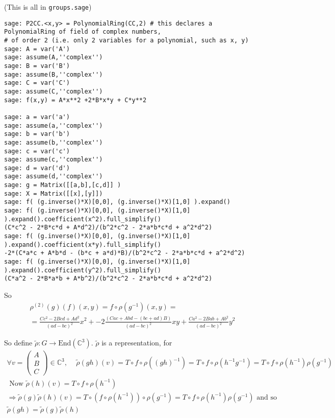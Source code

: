 \documentclass[10pt]{amsart}
\begin{document}
\begin{multicols*}{2}
\begin{enumerate}
(This is all in \verb|groups.sage|)
\begin{lstlisting}
sage: P2CC.<x,y> = PolynomialRing(CC,2) # this declares a PolynomialRing of field of complex numbers, 
# of order 2 (i.e. only 2 variables for a polynomial, such as x, y)
sage: A = var('A')
sage: assume(A,''complex'')
sage: B = var('B')
sage: assume(B,''complex'')
sage: C = var('C')
sage: assume(C,''complex'')
sage: f(x,y) = A*x**2 +2*B*x*y + C*y**2

sage: a = var('a')
sage: assume(a,''complex'')
sage: b = var('b')
sage: assume(b,''complex'')
sage: c = var('c')
sage: assume(c,''complex'')
sage: d = var('d')
sage: assume(d,''complex'')
sage: g = Matrix([[a,b],[c,d]] )
sage: X = Matrix([[x],[y]])
sage: f( (g.inverse()*X)[0,0], (g.inverse()*X)[1,0] ).expand()
sage: f( (g.inverse()*X)[0,0], (g.inverse()*X)[1,0] ).expand().coefficient(x^2).full_simplify()
(C*c^2 - 2*B*c*d + A*d^2)/(b^2*c^2 - 2*a*b*c*d + a^2*d^2)
sage: f( (g.inverse()*X)[0,0], (g.inverse()*X)[1,0] ).expand().coefficient(x*y).full_simplify()
-2*(C*a*c + A*b*d - (b*c + a*d)*B)/(b^2*c^2 - 2*a*b*c*d + a^2*d^2)
sage: f( (g.inverse()*X)[0,0], (g.inverse()*X)[1,0] ).expand().coefficient(y^2).full_simplify()
(C*a^2 - 2*B*a*b + A*b^2)/(b^2*c^2 - 2*a*b*c*d + a^2*d^2)
\end{lstlisting}

So 
\[
\begin{gathered}
  \rho^{(2)}(g)(f)(x,y) = f\circ \rho(g^{-1})(x,y) = \\
  = \frac{ Cc^2 - 2Bcd + Ad^2}{(ad-bc)^2}x^2 + - 2 \frac{ (Cac + Abd - (bc+ad) B)}{(ad-bc)^2} xy + \frac{ Ca^2 - 2Bab + Ab^2 }{(ad-bc)^2 } y^2
\end{gathered}
\]

So define $\widetilde{ \rho}: G \to \text{End}(\mathbb{C}^3)$. $\widetilde{\rho}$ is a representation, for 
\[
\begin{gathered}
  \forall v = \left( \begin{matrix} A \\ B \\ C \end{matrix} \right) \in \mathbb{C}^3, \quad \, \widetilde{\rho}(gh)(v) = T \circ f \circ \rho((gh)^{-1}) = T\circ f \circ \rho(h^{-1}g^{-1}) = T\circ f \circ \rho(h^{-1}) \rho(g^{-1}) \\ 
\text{ Now } \widetilde{\rho}(h)(v) = T\circ f \circ \rho(h^{-1}) \\
\Longrightarrow \widetilde{\rho}(g) \widetilde{\rho}(h)(v) = T \circ (f\circ \rho(h^{-1}))\circ \rho(g^{-1}) = T\circ f \circ \rho(h^{-1}) \rho(g^{-1}) \text{ and so }\\
\widetilde{\rho}(gh) = \widetilde{\rho}(g) \widetilde{\rho}(h)
\end{gathered}
\]


\end{enumerate}
\end{multicols*}
\end{document}
